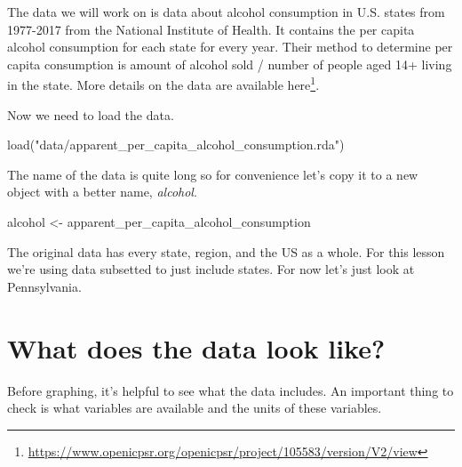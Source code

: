 \documentclass[
]{krantz}
\makeatletter
\newenvironment{Shaded}{\begin{snugshade}}{\end{snugshade}}
\newcommand{\FunctionTok}[1]{\textcolor[rgb]{0,0,0}{#1}}
\newcommand{\NormalTok}[1]{#1}
\newcommand{\OtherTok}[1]{\textcolor[rgb]{0.37,0.37,0.37}{#1}}
\newcommand{\SpecialCharTok}[1]{\textcolor[rgb]{0,0,0}{#1}}
\newcommand{\StringTok}[1]{\textcolor[rgb]{0.5,0.5,0.5}{#1}}
\renewcommand{\href}[2]{#2\footnote{\url{#1}}}
\newenvironment{kframe}{%
\medskip{}
\setlength{\fboxsep}{.8em}
 \def\at@end@of@kframe{}%
 \ifinner\ifhmode%
  \def\at@end@of@kframe{\end{minipage}}%
  \begin{minipage}{\columnwidth}%
 \fi\fi%
 \def\FrameCommand##1{\hskip\@totalleftmargin \hskip-\fboxsep
 \colorbox{shadecolor}{##1}\hskip-\fboxsep
     \hskip-\linewidth \hskip-\@totalleftmargin \hskip\columnwidth}%
 \MakeFramed {\advance\hsize-\width
   \@totalleftmargin\z@ \linewidth\hsize
   \@setminipage}}%
 {\par\unskip\endMakeFramed%
 \at@end@of@kframe}
\renewenvironment{Shaded}{\begin{kframe}}{\end{kframe}}
\makeatother
\begin{document}
The data we will work on is data about alcohol consumption in U.S. states from 1977-2017 from the National Institute of Health. It contains the per capita alcohol consumption for each state for every year. Their method to determine per capita consumption is amount of alcohol sold / number of people aged 14+ living in the state. More details on the data are available \href{https://www.openicpsr.org/openicpsr/project/105583/version/V2/view}{here}.

Now we need to load the data.

\begin{Shaded}
\begin{Highlighting}[]
\FunctionTok{load}\NormalTok{(}\StringTok{"data/apparent\_per\_capita\_alcohol\_consumption.rda"}\NormalTok{)}
\end{Highlighting}
\end{Shaded}

The name of the data is quite long so for convenience let's copy it to a new object with a better name, \emph{alcohol}.

\begin{Shaded}
\begin{Highlighting}[]
\NormalTok{alcohol }\OtherTok{\textless{}{-}}\NormalTok{ apparent\_per\_capita\_alcohol\_consumption}
\end{Highlighting}
\end{Shaded}

The original data has every state, region, and the US as a whole. For this lesson we're using data subsetted to just include states. For now let's just look at Pennsylvania.

\begin{Shaded}
\end{Shaded}

\hypertarget{what-does-the-data-look-like}{%
\section{What does the data look like?}\label{what-does-the-data-look-like}}

Before graphing, it's helpful to see what the data includes. An important thing to check is what variables are available and the units of these variables.
\end{document}
